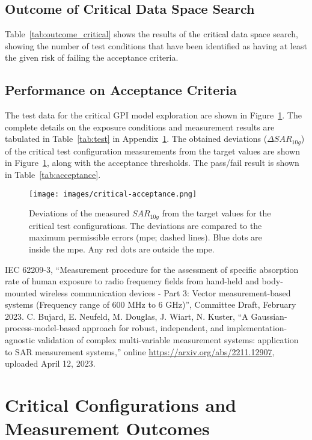 \documentclass{article}
\begin{document}


\subsection{Outcome of Critical Data Space Search}

Table~\ref{tab:outcome_critical} shows the results of the critical data space search, showing the number of test conditions that have been identified as having at least the given risk of failing the acceptance criteria.



\FloatBarrier
\subsection{Performance on Acceptance Criteria} \label{subsec:acceptance_criteria}
The test data for the critical GPI model exploration are shown in Figure~\ref{fig:critical-acc}. The complete details on the exposure conditions and measurement results are tabulated in Table~\ref{tab:test} in Appendix~\ref{sec:critical-data}.
The obtained deviations ($\Delta SAR_{10g}$) of the critical test configuration measurements from the target values are shown in Figure~\ref{fig:critical-acc}, along with the acceptance thresholds. The pass/fail result is shown in Table~\ref{tab:acceptance}.



\begin{figure}[H] \centering
\texttt{[image: images/critical-acceptance.png]}
\caption{Deviations of the measured $SAR_{10g}$ from the target values for the critical test configurations. The deviations are compared to the maximum permissible errors (mpe; dashed lines). Blue dots are inside the mpe. Any red dots are outside the mpe.} \label{fig:critical-acc}
\end{figure}

\FloatBarrier

\newpage

\begin{thebibliography}{9}
IEC 62209-3, ``Measurement procedure for the assessment of specific absorption rate of human exposure to radio frequency fields from hand-held and body-mounted wireless communication devices - Part 3: Vector measurement-based systems (Frequency range of 600 MHz to 6 GHz)'', Committee Draft, February 2023.
C. Bujard, E. Neufeld, M. Douglas, J. Wiart, N. Kuster, ``A Gaussian-process-model-based approach for robust, independent, and implementation-agnostic validation of complex multi-variable measurement systems: application to SAR measurement systems,'' online \url{https://arxiv.org/abs/2211.12907}, uploaded April 12, 2023.
\end{thebibliography}

\FloatBarrier
\newpage
\appendix
\section{Critical Configurations and Measurement Outcomes} \label{sec:critical-data}


\end{document}
